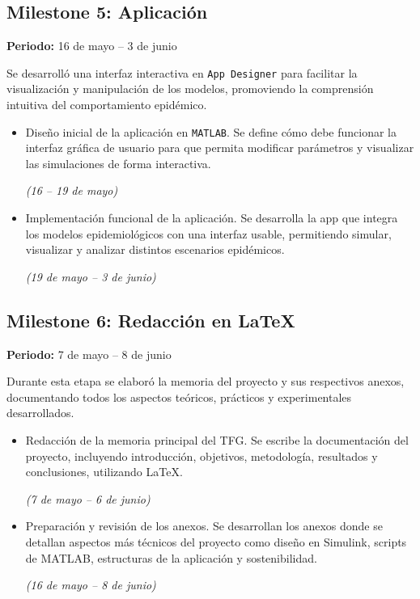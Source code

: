 \subsection*{Milestone 5: Aplicación}
\textbf{Periodo:} 16 de mayo – 3 de junio

Se desarrolló una interfaz interactiva en \texttt{App Designer} para facilitar la visualización y manipulación de los modelos, promoviendo la comprensión intuitiva del comportamiento epidémico.

\begin{itemize}
    \item Diseño inicial de la aplicación en \texttt{MATLAB}. Se define cómo debe funcionar la interfaz gráfica de usuario para que permita modificar parámetros y visualizar las simulaciones de forma interactiva.
    
    \textit{(16 – 19 de mayo)}
    \item Implementación funcional de la aplicación. Se desarrolla la app que integra los modelos epidemiológicos con una interfaz usable, permitiendo simular, visualizar y analizar distintos escenarios epidémicos.

    \textit{(19 de mayo – 3 de junio)}
\end{itemize}

\subsection*{Milestone 6: Redacción en LaTeX}
\textbf{Periodo:} 7 de mayo – 8 de junio

Durante esta etapa se elaboró la memoria del proyecto y sus respectivos anexos, documentando todos los aspectos teóricos, prácticos y experimentales desarrollados.

\begin{itemize}
    \item Redacción de la memoria principal del TFG. Se escribe la documentación del proyecto, incluyendo introducción, objetivos, metodología, resultados y conclusiones, utilizando LaTeX.
    
    \textit{(7 de mayo – 6 de junio)}
    \item Preparación y revisión de los anexos. Se desarrollan los anexos donde se detallan aspectos más técnicos del proyecto como diseño en Simulink, scripts de MATLAB, estructuras de la aplicación y sostenibilidad. 
    
    \textit{(16 de mayo – 8 de junio)}
\end{itemize}




